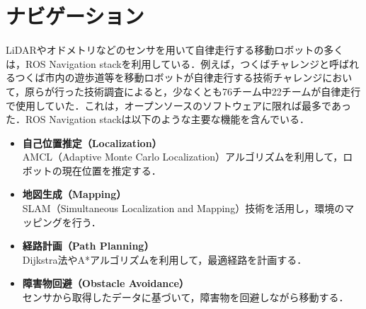 
\section{ナビゲーション}\label{sec:navigation-stack}
LiDARやオドメトリなどのセンサを用いて自律走行する移動ロボットの多くは，ROS Navigation stack\cite{nav1,nav2}を利用している．例えば，つくばチャレンジと呼ばれるつくば市内の遊歩道等を移動ロボットが自律走行する技術チャレンジにおいて，原らが行った技術調査\cite{robomech2024-hara}によると，少なくとも76チーム中22チームが自律走行で使用していた．これは，オープンソースのソフトウェアに限れば最多であった．ROS Navigation stackは以下のような主要な機能を含んでいる．

\begin{itemize}
     \item \textbf{自己位置推定（Localization）}\\
     AMCL（Adaptive Monte Carlo Localization）アルゴリズムを利用して，ロボットの現在位置を推定する．
     \item \textbf{地図生成（Mapping）}\\
     SLAM（Simultaneous Localization and Mapping）技術を活用し，環境のマッピングを行う．
     \item \textbf{経路計画（Path Planning）}\\
     Dijkstra法\cite{dijkstra2022note}やA*アルゴリズム\cite{hart1968formal-astar}を利用して，最適経路を計画する．
     \item \textbf{障害物回避（Obstacle Avoidance）}\\
     センサから取得したデータに基づいて，障害物を回避しながら移動する．
\end{itemize}

\newpage
